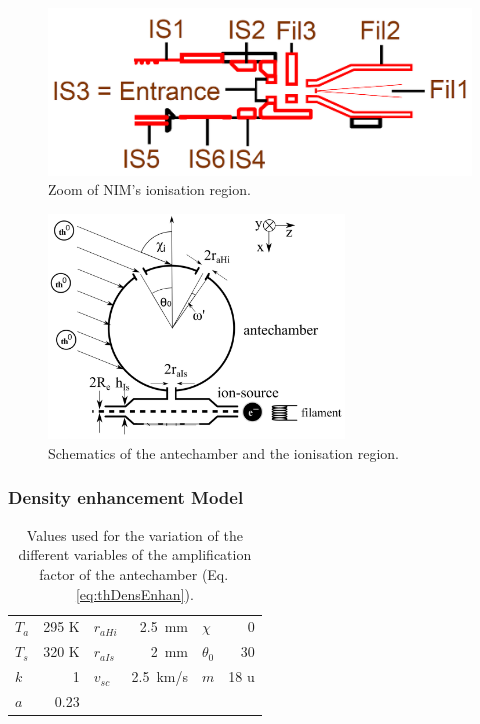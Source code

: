		\begin{figure}[h]
			\centering
			\includegraphics[width= .5\textwidth]{Bilder/NIM_schema_zoom_IS.png}
			\caption{Zoom of NIM's ionisation region.}
			\label{fig:ISZoom}
		\end{figure}
		\begin{figure}[h]
			\centering
			\includegraphics[width= 0.7\textwidth]{Bilder/particleDensEnh.png}
			\caption{Schematics of the antechamber and the ionisation region.}
			\label{fig:thAntIs}
		\end{figure}

		\subsubsection{Density enhancement Model}\label{subsubsec:Densenhan}
		\begin{table}
			\begin{center}
				\begin{tabular}{|l r |l r |l r|}
					\hline
					$T_a$ 	& 295 K	& $r_{aHi}$	& 2.5\, mm	& $\chi$	& 0\degree \\
					$T_s$ 	& 320 K & $r_{aIs}$ & 2\, mm	& $\theta_0$& 30\degree\\	
					$k$		&	1	& $v_{sc}$	& 2.5\, km/s& $m$		& 18 u\\
					$a$		& 0.23	&			&			&			&	\\
					\hline
				\end{tabular}
			\end{center}
			\caption{Values used for the variation of the different variables of the amplification factor of the antechamber (Eq.\,\eqref{eq:thDensEnhan}).}
			\label{tab:thDensEnhan}
		\end{table}
		
